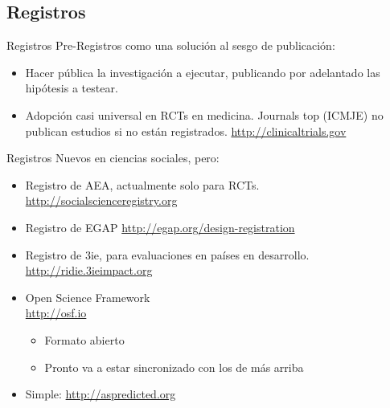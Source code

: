 \documentclass{beamer}
\begin{document}
\subsection* {Registros}
\begin{frame}{Registros}
Pre-Registros como una solución al sesgo de publicación:
 \begin{itemize}
  \item
  Hacer pública la investigación a ejecutar, publicando por adelantado las hipótesis a testear.
  \item

   Adopción casi universal en RCTs en medicina. Journals top (ICMJE) no publican estudios si no están registrados. \url{http://clinicaltrials.gov}
   
  
\end{itemize}
\end{frame}

\begin{frame}{Registros}
Nuevos en ciencias sociales, pero: 
   \begin{itemize}[<.->]
   \item   	
   	Registro de AEA, actualmente solo para RCTs. \url{http://socialscienceregistry.org}
   \item
    Registro de EGAP  \url{http://egap.org/design-registration}
   \item 
    Registro de 3ie, para evaluaciones en países en desarrollo. \url{http://ridie.3ieimpact.org}
   \item
   	Open Science Framework\\ \url{http://osf.io}
   	\begin{itemize}
   	\item
   	Formato abierto
   	\item
   	Pronto va a estar sincronizado con los de más arriba
   	\end{itemize}
   	\item Simple: \url{http://aspredicted.org}
   \end{itemize}
 
\end{frame}
\end{document}

